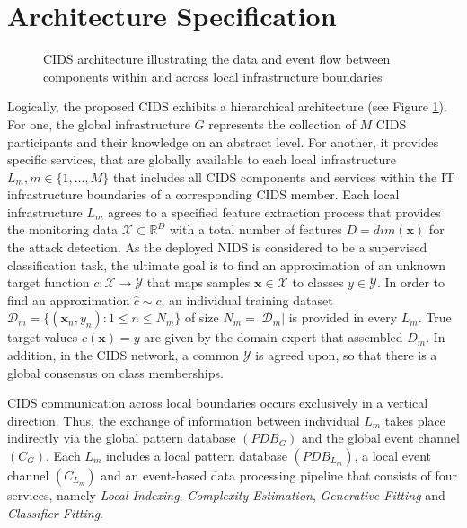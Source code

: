 \documentclass[../../main.tex]{subfiles}
\begin{document}
\section{Architecture Specification} \label{sec:architecture_specification}

\begin{figure}[b!]
    \centering
    
    \caption{CIDS architecture illustrating the data and event flow between components within and across local infrastructure boundaries}
    \label{fig:detailed_architecture}
    \end{figure}

    Logically, the proposed CIDS exhibits a hierarchical architecture (see Figure \ref{fig:detailed_architecture}). For one, the global infrastructure $G$ represents the collection of $M$ CIDS participants and their knowledge on an abstract level. For another, it provides specific services, that are globally available to each local infrastructure $L_m, m \in \{1, \dots, M\}$ that includes all CIDS components and services within the IT infrastructure boundaries of a corresponding CIDS member. Each local infrastructure $L_m$ agrees to a specified feature extraction process that provides the monitoring data $\mathcal{X} \subset \mathbb{R}^D$ with a total number of features $D = dim(\bm{x})$ for the attack detection. As the deployed NIDS is considered to be a supervised classification task, the ultimate goal is to find an approximation of an unknown target function $c: \mathcal{X} \rightarrow \mathcal{Y}$ that maps samples $\bm{x} \in \mathcal{X}$ to classes $y \in \mathcal{Y}$. In order to find an approximation $\hat{c} \sim c$, an individual training dataset $\mathcal{D}_m= \{(\bm{x}_n, y_n): 1 \leq n \leq N_m\}$ of size $N_m = |\mathcal{D}_m|$ is provided in every $L_m$. True target values $c(\bm{x}) = y$ are given by the domain expert that assembled $D_m$. In addition, in the CIDS network, a common $\mathcal{Y}$ is agreed upon, so that there is a global consensus on class memberships.
    
    CIDS communication across local boundaries occurs exclusively in a vertical direction. Thus, the exchange of information between individual $L_m$ takes place indirectly via the global pattern database $(PDB_G)$ and the global event channel $(C_G)$. Each $L_m$ includes a local pattern database $(PDB_{L_m})$, a local event channel $(C_{L_m})$ and an event-based data processing pipeline that consists of four services, namely \textit{Local Indexing}, \textit{Complexity Estimation}, \textit{Generative Fitting} and \textit{Classifier Fitting}. 
    
\end{document}
